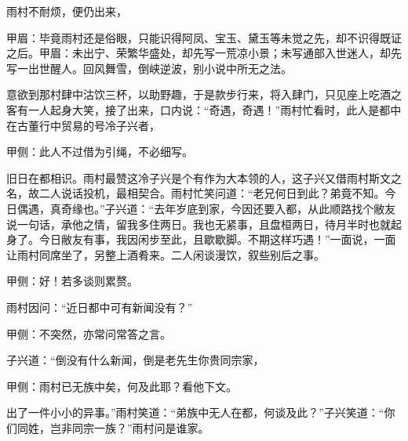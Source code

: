 \begin{parag}
    雨村不耐烦，便仍出来，\begin{note}甲眉：毕竟雨村还是俗眼，只能识得阿凤、宝玉、黛玉等未觉之先，却不识得既证之后。甲眉：未出宁、荣繁华盛处，却先写一荒凉小景；未写通部入世迷人，却先写一出世醒人。回风舞雪，倒峡逆波，别小说中所无之法。\end{note}意欲到那村肆中沽饮三杯，以助野趣，于是款步行来，将入肆门，只见座上吃酒之客有一人起身大笑，接了出来，口内说：“奇遇，奇遇！”雨村忙看时，此人是都中在古董行中贸易的号冷子兴者，\begin{note}甲侧：此人不过借为引绳，不必细写。\end{note}旧日在都相识。雨村最赞这冷子兴是个有作为大本领的人，这子兴又借雨村斯文之名，故二人说话投机，最相契合。雨村忙笑问道：“老兄何日到此？弟竟不知。今日偶遇，真奇缘也。”子兴道：“去年岁底到家，今因还要入都，从此顺路找个敝友说一句话，承他之情，留我多住两日。我也无紧事，且盘桓两日，待月半时也就起身了。今日敝友有事，我因闲步至此，且歇歇脚。不期这样巧遇！”一面说，一面让雨村同席坐了，另整上酒肴来。二人闲谈漫饮，叙些别后之事。\begin{note}甲侧：好！若多谈则累赘。\end{note}
\end{parag}


\begin{parag}
    雨村因问：“近日都中可有新闻没有？”\begin{note}甲侧：不突然，亦常问常答之言。\end{note}子兴道：“倒没有什么新闻，倒是老先生你贵同宗家，\begin{note}甲侧：雨村已无族中矣，何及此耶？看他下文。\end{note}出了一件小小的异事。”雨村笑道：“弟族中无人在都，何谈及此？”子兴笑道：“你们同姓，岂非同宗一族？”雨村问是谁家。
\end{parag}


